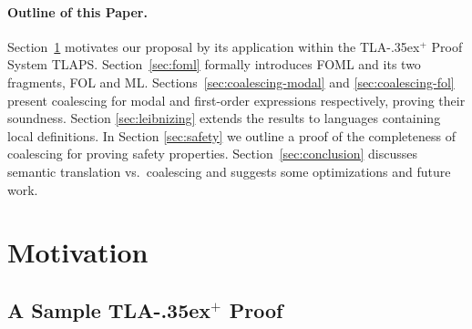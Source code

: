 \documentclass{easychair}
\newif\ifdraft
\newcommand{\commentOut}[1]{\ifdraft{%
 \edmargin{\color{green}\mbox{}\\[2em]Note}{Green text is commented out and
     appears only in draft mode.}%
\color{green}#1}\else\fi}
\newcommand{\tlaplus}{\mbox{TLA\kern -.35ex$^+$}\xspace}
\newcommand{\edmargin}[2]{\marginpar{\raggedright\footnotesize\color{red}#1: #2}}
\newcommand{\edmargin}[2]{}
\def\llmargin{\edmargin{LL}}
\def\smmargin{\edmargin{SM}}
\begin{document}
\paragraph{Outline of this Paper.}

%
Section~\ref{sec:motivation} motivates our proposal by its application within
the \tlaplus Proof System TLAPS.
Section~\ref{sec:foml} formally introduces FOML and its two fragments,
FOL and ML\@.  Sections~\ref{sec:coalescing-modal} and
\ref{sec:coalescing-fol} present coalescing for modal and first-order
expressions respectively, proving their soundness.  Section
\ref{sec:leibnizing} extends the results to languages containing local
definitions.  In Section \ref{sec:safety} we outline a proof of the completeness of coalescing for proving safety properties. Section~\ref{sec:conclusion} discusses semantic translation vs.\
coalescing and suggests some optimizations and future work.



\section{Motivation} \label{sec:motivation}


\subsection{A Sample \tlaplus Proof}
\end{document}
